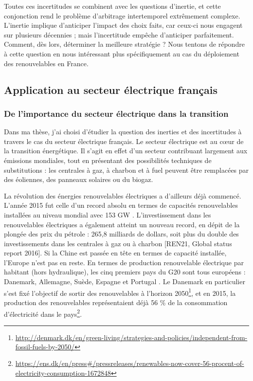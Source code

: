 Toutes ces incertitudes se combinent avec les questions d’inertie, et cette conjonction rend le problème d’arbitrage intertemporel extrêmement complexe. L’inertie implique d’anticiper l’impact des choix faits, car ceux-ci nous engagent sur plusieurs décennies ; mais l’incertitude empêche d’anticiper parfaitement. Comment, dès lors, déterminer la meilleure stratégie ? Nous tentons de répondre à cette question en nous intéressant plus spécifiquement au cas du déploiement des renouvelables en France.

\subsection{Application au secteur électrique français}
\subsubsection{De l’importance du secteur électrique dans la transition}
Dans ma thèse, j’ai choisi d’étudier la question des inerties et des incertitudes à travers le cas du secteur électrique français. Le secteur électrique est au cœur de la transition énergétique. Il s’agit en effet d’un secteur contribuant largement aux émissions mondiales, tout en présentant des possibilités techniques de substitutions : les centrales à gaz, à charbon et à fuel peuvent être remplacées par des éoliennes, des panneaux solaires ou du biogaz.

La révolution des énergies renouvelables électriques a d’ailleurs déjà commencé. L’année 2015 fut celle d’un record absolu en termes de capacités renouvelables installées au niveau mondial avec 153 GW \citep{InternationalEnergyAgency2016}. L’investissement dans les renouvelables électriques a également atteint un nouveau record, en dépit de la plongée des prix du pétrole : 265,8 milliards de dollars, soit plus du double des investissements dans les centrales à gaz ou à charbon [REN21, Global status report 2016]. 
Si la Chine est passée en tête en termes de capacité installée, l’Europe n’est pas en reste. En termes de production renouvelable électrique par habitant (hors hydraulique), les cinq premiers pays du G20 sont tous européens : Danemark, Allemagne, Suède, Espagne et Portugal \citep[p. 21]{REN212016}. Le Danemark en particulier s’est fixé l’objectif de sortir des renouvelables à l’horizon 2050\footnote{\url{http://denmark.dk/en/green-living/strategies-and-policies/independent-from-fossil-fuels-by-2050/}}, et en 2015, la production des renouvelables représentaient déjà 56 \% de la consommation d'électricité dans le pays\footnote{\url{https://ens.dk/en/press\#/pressreleases/renewables-now-cover-56-procent-of-electricity-consumption-1672848}}. 

